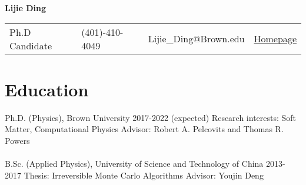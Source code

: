\documentclass[11pt,letterpaper]{article}
\begin{document}
\pagestyle{headings}

\begin{center}
    \Large{\textbf{Lijie Ding}} \\
\end{center}
\begin{center}
    \begin{tabular}{l l l l}
        Ph.D Candidate & (401)-410-4049 & Lijie\_Ding@Brown.edu & \href{https://ljding94.github.io}{Homepage}
    \end{tabular}
\end{center}

\section*{Education}
\vspace*{-0.1in}
Ph.D. (Physics), Brown University \hfill 2017-2022 (expected)\newline
Research interests: Soft Matter, Computational Physics \newline
Advisor: Robert A. Pelcovits and Thomas R. Powers
\vspace*{-0.05in}
\\~\\
B.Sc. (Applied Physics), University of Science and Technology of China \hfill 2013-2017\newline
Thesis: Irreversible Monte Carlo Algorithms \newline
Advisor: Youjin Deng
\end{document}
